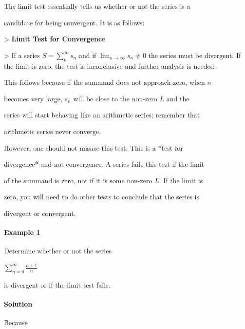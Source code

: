 The limit test essentially tells us whether or not the series is a

candidate for being convergent. It is as follows:





> \textbf{Limit Test for Convergence}

> If a series $S= \sum _{n}^{\infty}{s _n}$ and if $\lim _{n \rightarrow \infty}{s _n} \neq 0$ the series must be divergent. If the limit is zero, the test is inconclusive and further analysis is needed.



This follows because if the summand does not approach zero, when $n$

becomes very large, $s _n$ will be close to the non-zero $L$ and the

series will start behaving like an arithmetic series; remember that

arithmetic series never converge.



However, one should not misuse this test. This is a *test for

divergence* and not convergence. A series fails this test if the limit

of the summand is zero, not if it is some non-zero $L$. If the limit is

zero, you will need to do other tests to conclude that the series is

divergent or convergent.



\paragraph{Example 1}



Determine whether or not the series



$\sum _{n=0}^{\infty}{\frac{n+1}{n}}$



is divergent or if the limit test fails.



\paragraph{Solution}



Because




